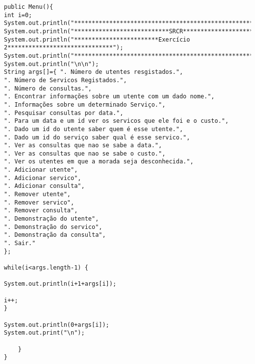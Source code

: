\documentclass[pdftex,12pt,a4paper]{report}
\begin{document}
\begin{appendices}
\begin{verbatim}
public Menu(){
int i=0;
System.out.println("*****************************************************************");
System.out.println("***************************SRCR**********************************");
System.out.println("************************Exercício 2******************************");
System.out.println("*****************************************************************");
System.out.println("\n\n");
String args[]={ ". Número de utentes resgistados.",
". Número de Servicos Registados.",
". Número de consultas.",
". Encontrar informações sobre um utente com um dado nome.",
". Informações sobre um determinado Serviço.",
". Pesquisar consultas por data.",
". Para um data e um id ver os servicos que ele foi e o custo.",
". Dado um id do utente saber quem é esse utente.",
". Dado um id do serviço saber qual é esse servico.",
". Ver as consultas que nao se sabe a data.",
". Ver as consultas que nao se sabe o custo.",
". Ver os utentes em que a morada seja desconhecida.",
". Adicionar utente",
". Adicionar servico",
". Adicionar consulta",
". Remover utente",
". Remover servico",
". Remover consulta",
". Demonstração do utente",
". Demonstração do servico",
". Demonstração da consulta",
". Sair."
};

while(i<args.length-1) {

System.out.println(i+1+args[i]);

i++;
}

System.out.println(0+args[i]);
System.out.print("\n");

	}
}
\end{verbatim}




\end{appendices}
\end{document}
